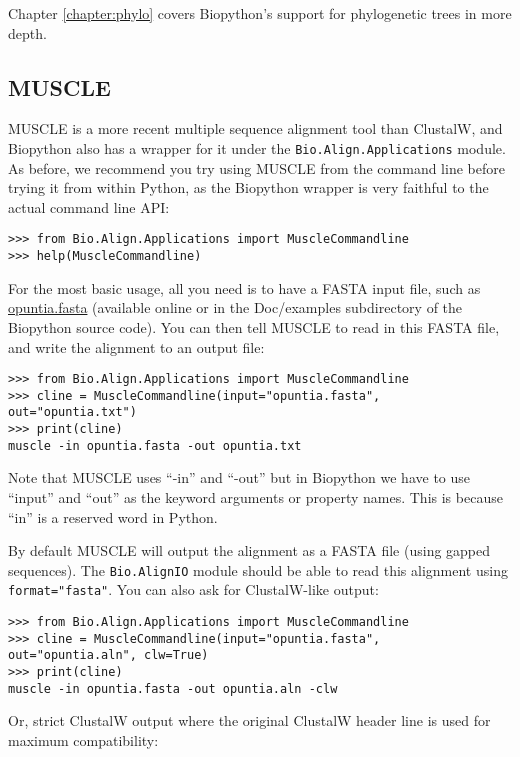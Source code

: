 \noindent Chapter \ref{chapter:phylo} covers Biopython's support for phylogenetic trees in more
depth.

\subsection{MUSCLE}
MUSCLE is a more recent multiple sequence alignment tool than ClustalW, and
Biopython also has a wrapper for it under the \verb|Bio.Align.Applications|
module. As before, we recommend you try using MUSCLE from the command line before
trying it from within Python, as the Biopython wrapper is very faithful to the
actual command line API:

\begin{verbatim}
>>> from Bio.Align.Applications import MuscleCommandline
>>> help(MuscleCommandline)
\end{verbatim}

For the most basic usage, all you need is to have a FASTA input file, such as
\href{https://raw.githubusercontent.com/biopython/biopython/master/Doc/examples/opuntia.fasta}{opuntia.fasta}
(available online or in the Doc/examples subdirectory of the Biopython source
code). You can then tell MUSCLE to read in this FASTA file, and write the
alignment to an output file:

\begin{verbatim}
>>> from Bio.Align.Applications import MuscleCommandline
>>> cline = MuscleCommandline(input="opuntia.fasta", out="opuntia.txt")
>>> print(cline)
muscle -in opuntia.fasta -out opuntia.txt
\end{verbatim}

Note that MUSCLE uses ``-in'' and ``-out'' but in Biopython we have to use
``input'' and ``out'' as the keyword arguments or property names. This is
because ``in'' is a reserved word in Python.

By default MUSCLE will output the alignment as a FASTA file (using gapped
sequences). The \verb|Bio.AlignIO| module should be able to read this
alignment using \texttt{format="fasta"}.
You can also ask for ClustalW-like output:

\begin{verbatim}
>>> from Bio.Align.Applications import MuscleCommandline
>>> cline = MuscleCommandline(input="opuntia.fasta", out="opuntia.aln", clw=True)
>>> print(cline)
muscle -in opuntia.fasta -out opuntia.aln -clw
\end{verbatim}

Or, strict ClustalW output where the original ClustalW header line is
used for maximum compatibility:

